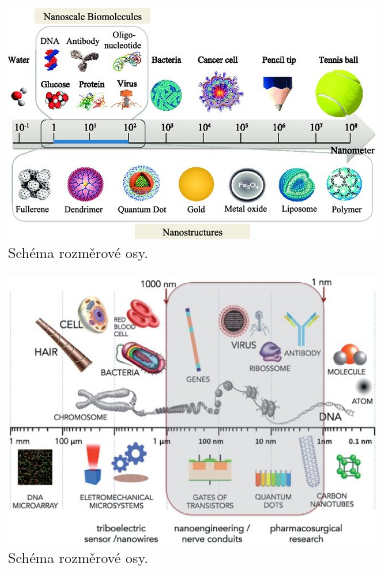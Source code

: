     \begin{figure}
        \centering
        \includegraphics[width=0.87\textwidth]{pictures/Nanoscale-integration-of-nanoparticles-and-biomolecules_W640.jpg}
        \caption{Schéma rozměrové osy. \cite{saallah2018}}
        \label{fig:scale_osa_1}
    \end{figure}
    
    \begin{figure}
        \centering
        \includegraphics[width=0.87\textwidth]{pictures/Scheme-with-nanoscale-comparison-Nanotechnology-are-related-to-the-study-extremely-small_W640.jpg}
        \caption{Schéma rozměrové osy. \cite{mendonca2017}}
        \label{fig:scale_osa_2}
    \end{figure}